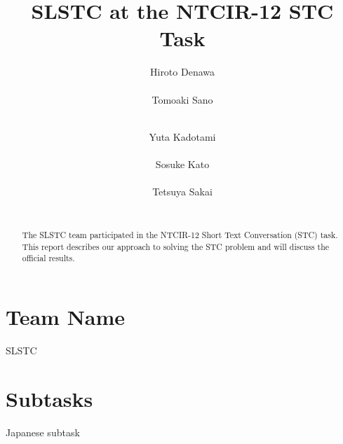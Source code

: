 \documentclass{../style/sig-alternate}
\begin{document}
\title{SLSTC at the NTCIR-12 STC Task}

\author{
%
%
\alignauthor
Hiroto Denawa\\
       \\
\alignauthor
Tomoaki Sano\\
       \\
\and  %
\alignauthor
Yuta Kadotami\\
       \\
\alignauthor
Sosuke Kato\\
       \\
\alignauthor
Tetsuya Sakai\\
       \\
}

\maketitle

\begin{abstract}
The SLSTC team participated in the NTCIR-12 Short Text Conversation
(STC) task.
This report describes our approach to solving the STC problem and will discuss the official results.
\end{abstract}

\section*{Team Name}
SLSTC

\section*{Subtasks}
Japanese subtask
\end{document}
